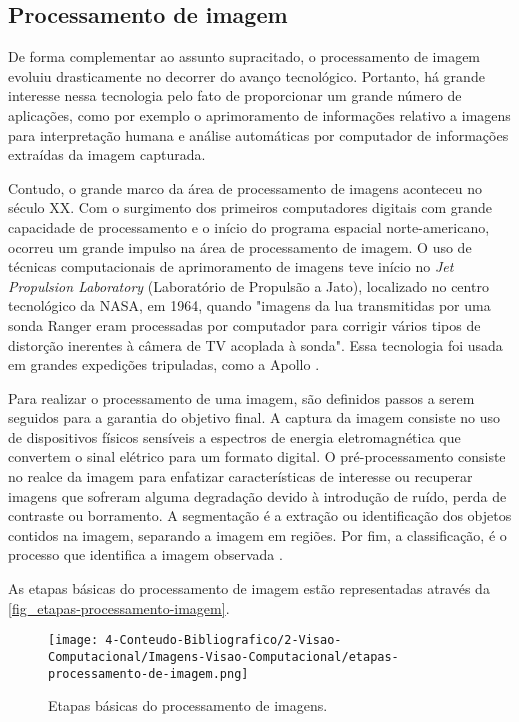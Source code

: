 \subsection{Processamento de imagem}

De forma complementar ao assunto supracitado, o processamento de imagem evoluiu drasticamente no decorrer do avanço tecnológico. Portanto, há grande interesse nessa tecnologia pelo fato de proporcionar um grande número de aplicações, como por exemplo o aprimoramento de informações relativo a imagens para interpretação humana e análise automáticas por computador de informações extraídas da imagem capturada.

Contudo, o grande marco da área de processamento de imagens aconteceu no século XX. Com o surgimento dos primeiros computadores digitais com grande capacidade de processamento e o início do programa espacial norte-americano, ocorreu um grande impulso na área de processamento de imagem. O uso de técnicas computacionais de aprimoramento de imagens teve início no \textit{Jet Propulsion Laboratory} (Laboratório de Propulsão a Jato), localizado no centro tecnológico da NASA, em 1964, quando "imagens da lua transmitidas por uma sonda Ranger eram processadas por computador para corrigir vários tipos de distorção inerentes à câmera de TV acoplada à sonda". Essa tecnologia foi usada em grandes expedições tripuladas, como a Apollo \cite{FILHO1999}.

Para realizar o processamento de uma imagem, são definidos passos a serem seguidos para a garantia do objetivo final. A captura da imagem consiste no uso de dispositivos físicos sensíveis a espectros de energia eletromagnética que convertem o sinal elétrico para um formato digital. O pré-processamento consiste no realce da imagem para enfatizar características de interesse ou recuperar imagens que sofreram alguma degradação devido à introdução de ruído, perda de contraste ou borramento. A segmentação é a extração ou identificação dos objetos contidos na imagem, separando a imagem em regiões. Por fim, a classificação, é o processo que identifica a imagem observada \cite{GONZALEZ2002}.

As etapas básicas do processamento de imagem estão representadas através da \autoref{fig_etapas-processamento-imagem}.

\begin{figure}[h]
	\caption{\label{fig_etapas-processamento-imagem}Etapas básicas do processamento de imagens.}
	\begin{center}
		\texttt{[image: 4-Conteudo-Bibliografico/2-Visao-Computacional/Imagens-Visao-Computacional/etapas-processamento-de-imagem.png]}
	\end{center}
	\centering {}
\end{figure}

